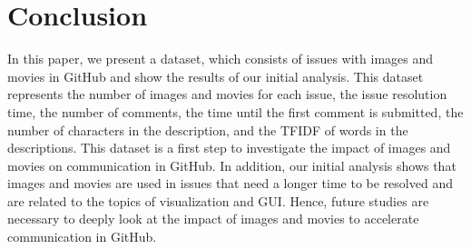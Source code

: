 \section{Conclusion}
\label{sec:conclusion}

In this paper, we present a dataset, 
which consists of issues with images and movies 
in GitHub and show the results of our initial analysis. 
This dataset represents the number of images and movies 
for each issue, 
the issue resolution time, 
the number of comments, 
the time until the first comment is submitted, 
the number of characters in the description, 
and the TFIDF of words in the descriptions. 
This dataset is a first step to investigate 
the impact of images and movies on communication in GitHub. 
In addition, our initial analysis shows that images and movies 
are used in issues that need a longer time to be resolved and 
are related to the topics of visualization and GUI. 
Hence, future studies are necessary to deeply look at 
the impact of images and movies to accelerate communication 
in GitHub.



